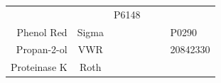 \documentclass[11pt,singlespacinge,twoside]{reedthesis} %
\begin{document}
\begin{longtable}[]{@{}rccccl@{}}
\begin{minipage}[t]{0.12\columnwidth}
\strut
\end{minipage} & \begin{minipage}[t]{0.12\columnwidth}\centering
\strut
\end{minipage} & \begin{minipage}[t]{0.14\columnwidth}\raggedright
P6148\strut
\end{minipage}\tabularnewline
\begin{minipage}[t]{0.19\columnwidth}\raggedleft
Phenol Red\strut
\end{minipage} & \begin{minipage}[t]{0.15\columnwidth}\centering
Sigma\strut
\end{minipage} & \begin{minipage}[t]{0.12\columnwidth}\centering
\strut
\end{minipage} & \begin{minipage}[t]{0.12\columnwidth}\centering
\strut
\end{minipage} & \begin{minipage}[t]{0.12\columnwidth}\centering
\strut
\end{minipage} & \begin{minipage}[t]{0.14\columnwidth}\raggedright
P0290\strut
\end{minipage}\tabularnewline
\begin{minipage}[t]{0.19\columnwidth}\raggedleft
Propan-2-ol\strut
\end{minipage} & \begin{minipage}[t]{0.15\columnwidth}\centering
VWR\strut
\end{minipage} & \begin{minipage}[t]{0.12\columnwidth}\centering
\strut
\end{minipage} & \begin{minipage}[t]{0.12\columnwidth}\centering
\strut
\end{minipage} & \begin{minipage}[t]{0.12\columnwidth}\centering
\strut
\end{minipage} & \begin{minipage}[t]{0.14\columnwidth}\raggedright
20842330\strut
\end{minipage}\tabularnewline
\begin{minipage}[t]{0.19\columnwidth}\raggedleft
Proteinase K\strut
\end{minipage} & \begin{minipage}[t]{0.15\columnwidth}\centering
Roth\strut
\end{minipage} & \begin{minipage}[t]{0.12\columnwidth}\centering

\end{minipage}
\end{longtable}
\end{document}
